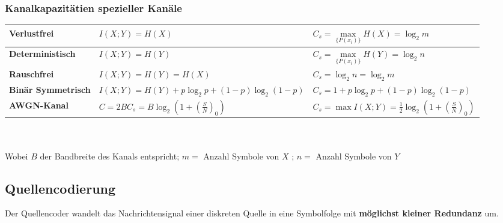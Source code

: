 \subsubsection{Kanalkapazitätien spezieller Kanäle}

	\renewcommand{\arraystretch}{2}
	\begin{tabular}{| p{3.5cm} | p{7.5cm} | p{6.5cm} |}
		\hline  
    		\textbf{Verlustfrei}
    			& $ I(X; Y) = H(X) $
    			& $ C_s = \max\limits_{\{ P(x_i) \}}{H (X)} = \log_2 m $ \\
		\hline
    		\textbf{Deterministisch}
    			& $ I(X; Y) = H(Y) $
    			& $ C_s = \max\limits_{\{ P(x_i) \}}{H (Y)} = \log_2 n $ \\
		\hline
    		\textbf{Rauschfrei}
    			& $ I(X; Y) = H(Y) = H(X)$
    			& $ C_s = \log_2 n = \log_2 m$ \\
		\hline
    		\textbf{Binär Symmetrisch}
    			& $ I(X; Y) = H(Y) + p \log_2 p + (1-p) \log_2 (1-p)$
    			& $ C_s = 1 + p \log_2 p + (1-p) \log_2 (1-p)$ \\
		\hline
    		\textbf{AWGN-Kanal}
    			& $ C = 2 B C_s = B \log_2 (1 + \left(\frac{S}{N}\right)_0)$ 
    			& $ C_s = \max{I(X; Y) = \frac{1}{2} \log_2 (1 + \left(\frac{S}{N}\right)_0)}$ \\
		\hline
 	\end{tabular}
	\renewcommand{\arraystretch}{1} \\ \\
Wobei $B$ der Bandbreite des Kanals entspricht; $ m =$ Anzahl Symbole von $X$ ; $n=$ Anzahl Symbole von $Y$

\subsection{Quellencodierung }
 Der Quellencoder wandelt das Nachrichtensignal einer diskreten Quelle in eine Symbolfolge mit \textbf{möglichst kleiner Redundanz} um.
